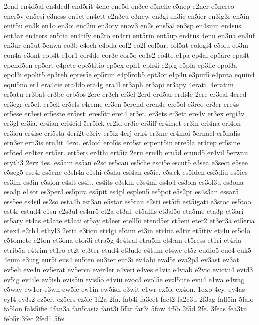 {2end
en4d5al
en4dedl
end5rit
4ene
ene5d
en3ee
e5nelle
e5nep
e2ner
e5nereo
ener5v
en5esi
e3ness
en1et
en4ett
e2n3eu
e3new
en3gi
en3ic
en5ier
en3ig3r
en5in
enit5u
en3k
en1o
en3oi
eno2m
en3oty
enov3
en2s
ens5al
en3sp
en4sum
en4sus
ent3ar
en4ters
en5tia
en4tify
en2to
en4tri
ent5rin
ent5up
en4tus
4enu
en3ua
en3uf
en3ur
en5ut
5enwa
eo3b
e4och
e4oda
eof2
eo2l
eol5ar.
eol5at
eologi4
e5olu
eo3m
eon4a
e3ont
eop4t
e1or1
eor4de
eor3e
eor5o
eo1s2
eo4to
e1pa
ep4al
ep5arc
epa4t
epend5en
ep5ert
e4pete
epe5titio
ep5ex
eph1
eph4i
e2pig
e5pla
ep3lic
epol3a
epol3i
epolit5
ep3reh
epres5e
ep5rim
e4p5rob5
ept3or
e1p4u
e3pur5
e4puta
equin4
equi5no
er1
era4cie
era4do
era4g
era4l
er3aph
er3api
er3apy
4erati.
4eratim
er5atu
er3bat
er3be
erb5os
2erc
er3ch
er3cl
2erd
erd5ar
erdi4e
2ere
er3eal
4ered
er3egr
er5el.
er5ell
er5els
e4reme
er3en
5erend
eren4e
ere5ol
e3req
er3er
ere4s
er5ese
er3esi
er5este
er5esti
eres5tr
eret4
er3et.
er3ets
er3ett
ere4v
er3ex
ergi3v
er3gl
er3ia.
er4ian
eri4cid
5er5ick
er2id
er3ie
er3iff
er4imet
er3in
eri4na
eri4on
er3iou
er4isc
eri5sta
4eri2t
e3riv
er5iz
4erj
erk4
er3me
er4moi
5ernacl
er5nalis
ern3er
ern3is
ern3it
4ero.
er3oid
ero5is
ero5st
erpent5in
erre5la
er4rep
er5sine
er5ted
er4ter
ert5er.
ert5ers
er4thi
ert5iz
2eru
eru4b
eru5d
erund5
er4vil
5erwau
eryth3
2erz
4es.
es5am
es5an
e2sc
es5can
es5che
esci5e
escut5
e3sea
e3sect
e5see
e5seg5
ese4l
es5enc
e3sh4a
e1shi
e5shu
esi4an
es5ic.
e5sick
es5iden
esi5diu
es5ies
es3im
es3in
e5sion
e4sit
es4it.
es4its
e3skin
e3s4mi
es4od
es3ola
es3ol3u
es3ona
eso3p
e1sor
es3per3
es5pira
es5pit
es4pl
esplen5
es5pot
e5s2pr
es4s3an
essar5
ess5ee
es4sil
es2so
esta4b
est3an
e5star
es5tau
e2sti
est5ifi
est5igati
e3stoc
es5too
est4r
estud4
e1su
e2s3ul
es4ur5
et2a
et3al.
et5allis
et3al5o
eta5me
eta3p
et3ari
et5ary
et4as
et3ate
et3ati
et5ay
et3eer
etell5i
etend5er
et5eni
eter2
et3er3a
et5eria
etex4
e2th1
ethyl3
2etia
e3ticu
eti4gi
e5tim
et3in
eti4na
e3tir
et5itiv
eti4u
et5olo
e5tomete
e2ton
et3ona
etor3i
etra5g
4e4tral
etra5m
et4ran
et5ress
et1ri
et4ria
etrib5a
e4trim
et1ro
et2t
et3ter
etud4
et3ude
e4tum
et4we
et5z
eudio5
eue4
euk5
4eum
e3urg
eur5i
eus4
eu5ten
eu3ter
eut3i
ev4abi
eval5e
eva2p3
ev3ast
ev3at
ev5eli
eve4n
ev5erat
ev5eren
ever4er
e4veri
e4ves
e1via
e4viab
e2vic
evictu4
evid3
ev5ig
ev4ile
ev5ish
evis5in
evis5o
e4viu
evoc3
evol5e
evol5ute
evu4
e1wa
e4wag
e5way
ew1er
e3wh
ew5ie
ew1in
ew5ish
e3wit
e1wr
ex5ic
ex4on.
1exp
4ey.
ey4as
eyl4
ey3s2
ez5er.
ez5ers
ez5ie
1f2a
2fa.
fab4i
fa3cet
fact2
fa2c3u
2f3ag
fall5in
5falo
fa5lon
fals5ifie
4fan3a
fan5tasiz
fant3i
5far
far3i
5faw
4f5b
2f5d
2fe.
3feas
fea3tu
feb5r
3fec
2fed1
5fei
}
